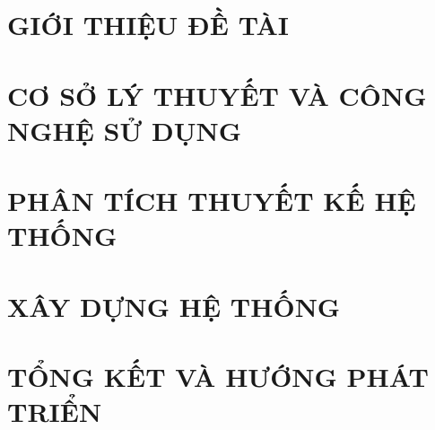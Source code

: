 \documentclass[a4paper,13pt,3p,twoside]{report}
\theoremstyle{definition}
\begin{document}
\printnoidxglossaries

\newpage
\renewcommand*{\acronymname}{DANH MỤC THUẬT NGỮ VÀ TỪ VIẾT TẮT}


\newpage


\newpage
{}

\pagestyle{fancy}
\fancyhf{}
\fancyhead[RE, LO]{\leftmark}
\fancyfoot[RE, LO]{\thepage}

\chapter{GIỚI THIỆU ĐỀ TÀI}
\label{chapter:Introduction}

\newpage
\chapter{CƠ SỞ LÝ THUYẾT VÀ CÔNG NGHỆ SỬ DỤNG}
\label{chapter:Related_works}


\newpage
\chapter{PHÂN TÍCH THUYẾT KẾ HỆ THỐNG}
\label{chapter:Methodology}


\newpage
\chapter{XÂY DỰNG HỆ THỐNG}
\label{chapter:Experiment}


\newpage
\chapter{TỔNG KẾT VÀ HƯỚNG PHÁT TRIỂN}
\label{chapter:SolutionAndContribution}

\newpage
% 
\end{document}
